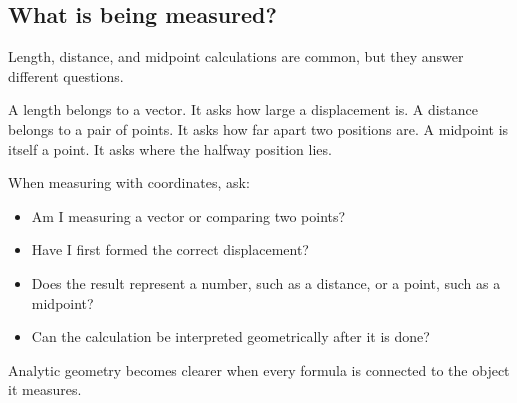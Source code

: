\subsection*{What is being measured?}

Length, distance, and midpoint calculations are common, but they answer different questions.

A length belongs to a vector. It asks how large a displacement is. A distance belongs to a pair of points. It asks how far apart two positions are. A midpoint is itself a point. It asks where the halfway position lies.

\begin{summarybox}
When measuring with coordinates, ask:
\begin{itemize}
\item Am I measuring a vector or comparing two points?
\item Have I first formed the correct displacement?
\item Does the result represent a number, such as a distance, or a point, such as a midpoint?
\item Can the calculation be interpreted geometrically after it is done?
\end{itemize}
\end{summarybox}

Analytic geometry becomes clearer when every formula is connected to the object it measures.